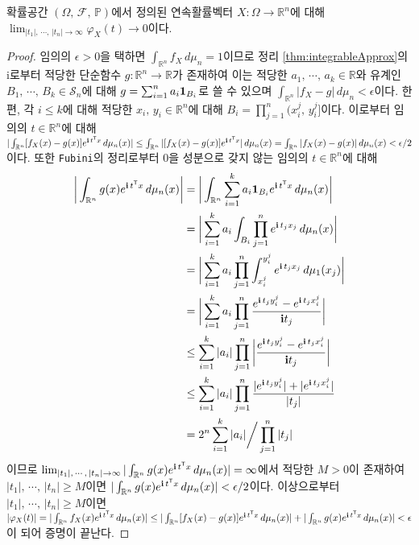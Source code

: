 \begin{theorem}
    확률공간 $(\Omega,\,\mathcal{F},\,\mathbb{P})$에서 정의된 연속활률벡터 $X:\Omega\to\mathbb{R}^n$에 대해 $\lim_{|t_1|,\,\cdots,\,|t_n|\to\infty}\varphi_X(t)\to0$이다.
\end{theorem}

\begin{proof}
    임의의 $\epsilon>0$을 택하면 $\int_{\mathbb{R}^n}f_X\,d\mu_n=1$이므로 정리 \ref{thm:integrableApprox}의 i로부터 적당한 단순함수 $g:\mathbb{R}^n\to\mathbb{R}$가 존재하여 이는 적당한 $a_1,\,\cdots,\,a_k\in\mathbb{R}$와 유계인 $B_1,\,\cdots,\,B_k\in\mathcal{S}_n$에 대해 $g=\sum_{i=1}^na_i\mathbf{1}_{B_i}$로 쓸 수 있으며 $\int_{\mathbb{R}^n}|f_X-g|\,d\mu_n<\epsilon$이다. 한편, 각 $i\leq k$에 대해 적당한 $x_i,\,y_i\in\mathbb{R}^n$에 대해 $B_i=\prod_{j=1}^n(x_i^j,\,y_i^j]$이다. 이로부터 임의의 $t\in\mathbb{R}^n$에 대해 $|\int_{\mathbb{R}^n}[f_X(x)-g(x)]e^{\mathbf{i}\,t^{\mathsf{T}} x}\,d\mu_n(x)|\leq\int_{\mathbb{R}^n}|[f_X(x)-g(x)]e^{\mathbf{i}\,t^{\mathsf{T}} x}|\,d\mu_n(x)=\int_{\mathbb{R}^n}|f_X(x)-g(x)|\,d\mu_n(x)<\epsilon/2$이다. 또한 \texttt{Fubini}의 정리로부터 $0$을 성분으로 갖지 않는 임의의 $t\in\mathbb{R}^n$에 대해
    \begin{align*}
        \bigg|\int_{\mathbb{R}^n}g(x)e^{\mathbf{i}\,t^{\mathsf{T}} x}\,d\mu_n(x)\bigg|&=\bigg|\int_{\mathbb{R}^n}\sum_{i=1}^ka_i\mathbf{1}_{B_i}e^{\mathbf{i}\,t^{\mathsf{T}} x}\,d\mu_n(x)\bigg|\\
        &=\bigg|\sum_{i=1}^ka_i\int_{B_i}\prod_{j=1}^ne^{\mathbf{i}\,t_jx_j}\,d\mu_n(x)\bigg|\\
        &=\bigg|\sum_{i=1}^ka_i\prod_{j=1}^n\int_{x_i^j}^{y_i^j}e^{\mathbf{i}\,t_jx_j}\,d\mu_1(x_j)\bigg|\\
        &=\bigg|\sum_{i=1}^ka_i\prod_{j=1}^n\frac{e^{\mathbf{i}\,t_jy_i^j}-e^{\mathbf{i}\,t_jx_i^j}}{\mathbf{i} t_j}\bigg|\\
        &\leq\sum_{i=1}^k|a_i|\prod_{j=1}^n\bigg|\frac{e^{\mathbf{i}\,t_jy_i^j}-e^{\mathbf{i}\,t_jx_i^j}}{\mathbf{i} t_j}\bigg|\\
        &\leq\sum_{i=1}^k|a_i|\prod_{j=1}^n\frac{|e^{\mathbf{i}\,t_jy_i^j}|+|e^{\mathbf{i}\,t_jx_i^j}|}{|t_j|}\\
        &=2^n\sum_{i=1}^k|a_i|\bigg/\prod_{j=1}^n|t_j|
    \end{align*}
    이므로 $\lim_{|t_1|,\,\cdots,\,|t_n|\to\infty}|\int_{\mathbb{R}^n}g(x)e^{\mathbf{i}\,t^{\mathsf{T}} x}\,d\mu_n(x)|=\infty$에서 적당한 $M>0$이 존재하여 $|t_1|,\,\cdots,\,|t_n|\geq M$이면 $|\int_{\mathbb{R}^n}g(x)e^{\mathbf{i}\,t^{\mathsf{T}} x}\,d\mu_n(x)|<\epsilon/2$이다. 이상으로부터 $|t_1|,\,\cdots,\,|t_n|\geq M$이면 $|\varphi_X(t)|=|\int_{\mathbb{R}^n}f_X(x)e^{\mathbf{i}\,t^{\mathsf{T}} x}\,d\mu_n(x)|\leq|\int_{\mathbb{R}^n}[f_X(x)-g(x)]e^{\mathbf{i}\,t^{\mathsf{T}} x}\,d\mu_n(x)|+|\int_{\mathbb{R}^n}g(x)e^{\mathbf{i}\,t^{\mathsf{T}} x}\,d\mu_n(x)|<\epsilon$이 되어 증명이 끝난다.
\end{proof}

